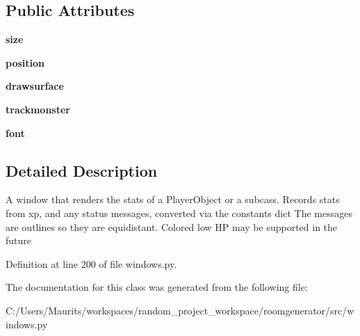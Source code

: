 \subsection*{Public Attributes}
\begin{DoxyCompactItemize}
\item 
\hypertarget{classwindows_1_1_stat_window_ab602832c51de7d46e84fc1a7be18b63d}{}{\bfseries size}\label{classwindows_1_1_stat_window_ab602832c51de7d46e84fc1a7be18b63d}

\item 
\hypertarget{classwindows_1_1_stat_window_aa34bd2e55460b95bb6c801072a8e8992}{}{\bfseries position}\label{classwindows_1_1_stat_window_aa34bd2e55460b95bb6c801072a8e8992}

\item 
\hypertarget{classwindows_1_1_stat_window_a0b7fdd64e78fb63e5899db45d0010f06}{}{\bfseries drawsurface}\label{classwindows_1_1_stat_window_a0b7fdd64e78fb63e5899db45d0010f06}

\item 
\hypertarget{classwindows_1_1_stat_window_a594342da108161a799f27884199c52b7}{}{\bfseries trackmonster}\label{classwindows_1_1_stat_window_a594342da108161a799f27884199c52b7}

\item 
\hypertarget{classwindows_1_1_stat_window_acdfeebcf6ea062c9063c412f56d9bf6b}{}{\bfseries font}\label{classwindows_1_1_stat_window_acdfeebcf6ea062c9063c412f56d9bf6b}

\end{DoxyCompactItemize}


\subsection{Detailed Description}
\begin{DoxyVerb}A window that renders the stats of a PlayerObject or a subcass. Records stats from xp, and any status messages, converted via the constants dict
The messages are outlines so they are equidistant. Colored low HP may be supported in the future\end{DoxyVerb}
 

Definition at line 200 of file windows.\+py.



The documentation for this class was generated from the following file\+:\begin{DoxyCompactItemize}
\item 
C\+:/\+Users/\+Maurits/workspaces/random\+\_\+project\+\_\+workspace/roomgenerator/src/windows.\+py\end{DoxyCompactItemize}
